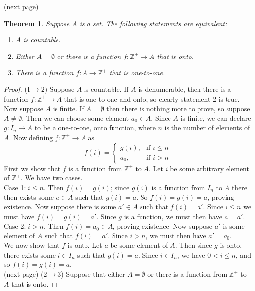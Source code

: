 \documentclass{report}
\newtheorem*{theorem}{Theorem}
\theoremstyle{definition}
\begin{document}
\noindent (next page)
\newpage
\begin{theorem}
Suppose $A$ is a set. The following statements are equivalent:
\begin{enumerate}
\item $A$ is countable.
\item Either $A=\emptyset$ or there is a function $f:\mathbb Z^+\to A$ that is onto.
\item There is a function $f:A\to\mathbb Z^+$ that is one-to-one.
\end{enumerate}
\end{theorem}
\begin{proof}
($1\rightarrow2$) Suppose $A$ is countable. If $A$ is denumerable, then there is a function $f:\mathbb Z^+\to A$ 
that is one-to-one and onto, so clearly statement 2 is true.
Now suppose $A$ is finite. If $A=\emptyset$ then there is nothing more to prove, so suppose $A\neq\emptyset$. 
Then we can choose some element $a_0\in A$. Since $A$ is finite, we can declare $g:I_n\to A$ to be a one-to-one, 
onto function, where $n$ is the number of elements of $A$.
Now defining $f:\mathbb Z^+\to A$ as
\begin{equation*}
f(i)=\begin{cases}
g(i),&\text{if $i\leq n$}\\
a_0,&\text{if $i>n$}
\end{cases}
\end{equation*}
First we show that $f$ is a function from $\mathbb Z^+$ to $A$. Let $i$ be some arbitrary element of $\mathbb Z^+$.
We have two cases.\\
\indent Case 1: $i\leq n$. Then $f(i)=g(i)$; since $g(i)$ is a function from $I_n$ to $A$ there then exists some 
$a\in A$ such that $g(i)=a$. So $f(i)=g(i)=a$, proving existence. Now suppose there is some $a'\in A$ such that 
$f(i)=a'$. Since $i\leq n$ we must have $f(i)=g(i)=a'$. Since $g$ is a function, we must then have $a=a'$.\\
\indent Case 2: $i>n$. Then $f(i)=a_0\in A$, proving existence. Now suppose $a'$ is some element of $A$ such that 
$f(i)=a'$. Since $i>n$, we must then have $a'=a_0$.\\
\indent We now show that $f$ is onto. Let $a$ be some element of $A$. Then since $g$ is onto, there exists some $i\in I_n$
such that $g(i)=a$. Since $i\in I_n$, we have $0<i\leq n$, and so
$f(i)=g(i)=a$.\\
(next page)\newpage
\noindent($2\rightarrow3$) Suppose that either $A=\emptyset$ or there is a function from $\mathbb Z^+$ to $A$ that is onto.

\end{proof}
\end{document}
